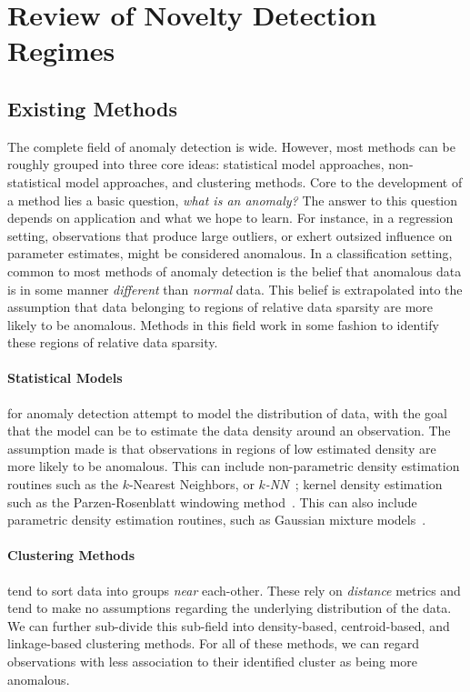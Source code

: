\section{Review of Novelty Detection Regimes}

\subsection{Existing Methods}
The complete field of anomaly detection is wide.  However, most methods can be 
    roughly grouped into three core ideas: statistical model approaches, 
    non-statistical model approaches, and clustering methods. Core to the 
    development of a method lies a basic question, \emph{what is an anomaly?}  
    The answer to this question depends on application and what we hope to
    learn.  For instance, in a regression setting, observations that produce 
    large outliers, or exhert outsized influence on parameter estimates, might 
    be considered anomalous.  In a classification setting, common to most 
    methods of anomaly detection is the belief that anomalous data is in some 
    manner \emph{different} than \emph{normal} data. This belief is extrapolated
    into the assumption that data belonging to regions of relative data sparsity
    are more likely to be anomalous.  Methods in this field work in some fashion
     to identify these regions of relative data sparsity.

\paragraph{Statistical Models} for anomaly detection attempt to model the 
    distribution of data, with the goal that the model can be to estimate the 
    data density around an observation. The assumption made is that observations
    in regions of low estimated density are more likely to be anomalous.  This 
    can include non-parametric density estimation routines such as the 
    $k$-Nearest Neighbors, or \emph{$k$-NN}~\citep{kramer2013}; kernel density 
    estimation such as the Parzen-Rosenblatt windowing 
    method~\citep{parzen1962,rosenblatt1956}.  This can also include parametric 
    density estimation routines, such as Gaussian mixture 
    models~\citep{mcnicholas2010}.

\paragraph{Clustering Methods} tend to sort data into groups \emph{near} 
    each-other.  These rely on \emph{distance} metrics and tend to make no 
    assumptions regarding the underlying distribution of the data.  We can 
    further sub-divide this sub-field into density-based, centroid-based, and 
    linkage-based clustering methods.  For all of these methods, we can regard 
    observations with less association to their identified cluster as being more
    anomalous.

